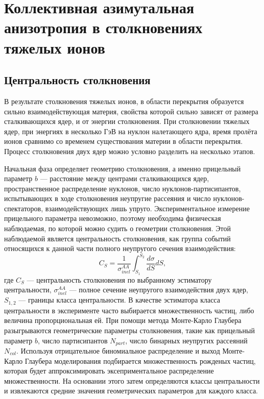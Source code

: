 \chapter{Коллективная азимутальная анизотропия в столкновениях тяжелых ионов} \label{chapt1}

\section{Центральность столкновения}

В результате столкновения тяжелых ионов, в области перекрытия образуется сильно взаимодействующая материя, свойства которой сильно зависят от размера сталкивающихся ядер, и от энергии столкновения.
При столкновении тяжелых ядер, при энергиях в несколько ГэВ на нуклон налетающего ядра, время пролёта ионов сравнимо со временем существования материи в области перекрытия.
Процесс столкновения двух ядер можно условно разделить на несколько этапов.

Начальная фаза определяет геометрию столкновения, а именно прицельный параметр $b$ --- расстояние между центрами сталкивающихся ядер, пространственное распределение нуклонов, число нуклонов-партисипантов, испытывающих в ходе столкновения неупругие рассеяния и число нуклонов-спектаторов, взаимодействующих лишь упруго.  
Экспериментальное измерение прицельного параметра невозможно, поэтому необходима физическая наблюдаемая, по которой можно судить о геометрии столкновения.
Этой наблюдаемой является центральность столкновения, как группа событий относящихся к данной части полного неупругого сечения взаимодействия:
%
\begin{equation}
    C_S = \frac{1}{ \sigma_{inel}^{AA} } \int_{S_1}^{S_2} \frac{d\sigma}{dS}dS,
\end{equation}
где $C_S$ --- центральность столкновения по выбранному эстиматору центральности, $\sigma_{inel}^{AA}$ --- полное сечение неупругого взаимодействия двух ядер, $S_{1,2}$ --- границы класса центральности.
В качестве эстиматора класса центральности в эксперименте часто выбирается множественность частиц, либо величина пропорциональная ей.
При помощи метода Монте-Карло Глаубера разыгрываются геометрические параметры столкновения, такие как прицельный параметр $b$, число партисипантов $N_{part}$, число бинарных неупругих рассеяний $N_{col}$.
Используя отрицательное биномиальное распределение и выход Монте-Карло Глаубера моделирования подбирается множественность рожденых частиц, которая будет аппроксимировать эксеприментальное распределение множественности.
На основании этого затем определяются классы центральности и извлекаются средние значения геометрических параметров для каждого класса.

